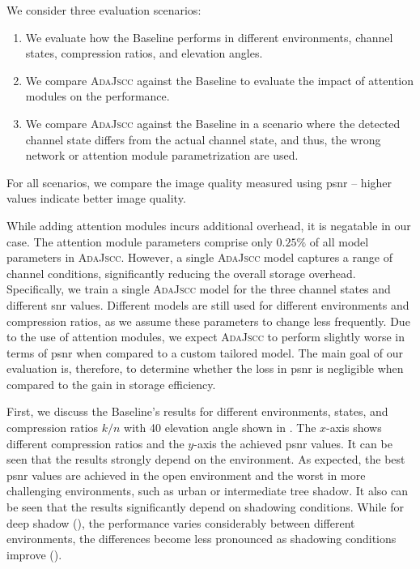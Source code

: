 \documentclass[conference]{IEEEtran}
\newcommand\ours{\textsc{AdaJscc}\xspace}
\newcommand\baseline{Baseline\xspace}
\begin{document}
We consider three evaluation scenarios:
%
\begin{enumerate}
  \item We evaluate how the \baseline performs in different environments, channel states, compression ratios, and elevation angles.
  \item We compare \ours against the \baseline to evaluate the impact of attention modules on the performance.
  \item We compare \ours against the \baseline in a scenario where the detected channel state differs from the actual channel state, and thus, the wrong network or attention module parametrization are used.
\end{enumerate}

For all scenarios, we compare the image quality measured using \ac{psnr} -- higher values indicate better image quality.

While adding attention modules incurs additional overhead, it is negatable in our case. 
The attention module parameters comprise only $0.25\%$ of all model parameters in \ours.  
However, a single \ours model captures a range of channel conditions, significantly reducing the overall storage overhead.
Specifically, we train a single \ours model for the three channel states and different \ac{snr} values.
Different models are still used for different environments and compression ratios, as we assume these parameters to change less frequently.
Due to the use of attention modules, we expect \ours to perform slightly worse in terms of \ac{psnr} when compared to a custom tailored model.
The main goal of our evaluation is, therefore, to determine whether the loss in \ac{psnr} is negligible when compared to the gain in storage efficiency.

First, we discuss the \baseline's results for different environments, states, and compression ratios $k/n$ with 40\textdegree{} elevation angle shown in . 
The $x$-axis shows different compression ratios and the $y$-axis the achieved \ac{psnr} values.
It can be seen that the results strongly depend on the environment.
As expected, the best \ac{psnr} values are achieved in the open environment and the worst in more challenging environments, such as urban or intermediate tree shadow.
It also can be seen that the results significantly depend on shadowing conditions. 
While for deep shadow (), the performance varies considerably between different environments, 
the differences become less pronounced as shadowing conditions improve ().
\end{document}
